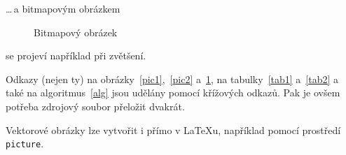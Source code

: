 \documentclass[a4paper,11pt]{article}[20-03-2022]
\begin{document}
\noindent\dots\,a bitmapovým obrázkem

\begin{figure}[h]
    \centering
    \caption{Bitmapový obrázek}
    \label{pic3}
\end{figure}
\bigskip
\noindent se projeví například při zvětšení.

Odkazy (nejen ty) na obrázky~\ref{pic1},~\ref{pic2} a~\ref{pic3}, na tabulky~\ref{tab1} a~\ref{tab2} a také na algoritmus~\ref{alg} jsou udělány pomocí křížových odkazů. 
Pak je ovšem potřeba zdrojový soubor přeložit dvakrát.

Vektorové obrázky lze vytvořit i přímo v \LaTeX u, například pomocí prostředí\texttt{ picture}.
\end{document}
